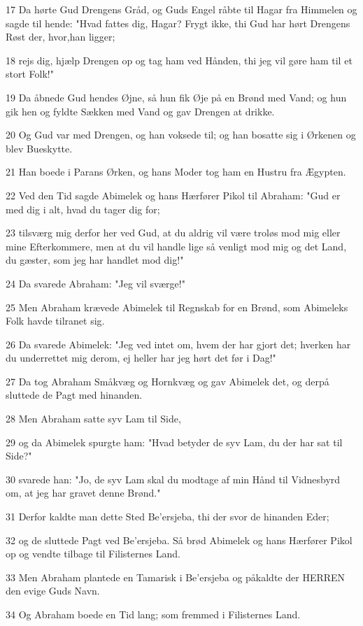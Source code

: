 \par 17 Da hørte Gud Drengens Gråd, og Guds Engel råbte til Hagar fra Himmelen og sagde til hende: "Hvad fattes dig, Hagar? Frygt ikke, thi Gud har hørt Drengens Røst der, hvor,han ligger;
\par 18 rejs dig, hjælp Drengen op og tag ham ved Hånden, thi jeg vil gøre ham til et stort Folk!"
\par 19 Da åbnede Gud hendes Øjne, så hun fik Øje på en Brønd med Vand; og hun gik hen og fyldte Sækken med Vand og gav Drengen at drikke.
\par 20 Og Gud var med Drengen, og han voksede til; og han bosatte sig i Ørkenen og blev Bueskytte.
\par 21 Han boede i Parans Ørken, og hans Moder tog ham en Hustru fra Ægypten.
\par 22 Ved den Tid sagde Abimelek og hans Hærfører Pikol til Abraham: "Gud er med dig i alt, hvad du tager dig for;
\par 23 tilsværg mig derfor her ved Gud, at du aldrig vil være troløs mod mig eller mine Efterkommere, men at du vil handle lige så venligt mod mig og det Land, du gæster, som jeg har handlet mod dig!"
\par 24 Da svarede Abraham: "Jeg vil sværge!"
\par 25 Men Abraham krævede Abimelek til Regnskab for en Brønd, som Abimeleks Folk havde tilranet sig.
\par 26 Da svarede Abimelek: "Jeg ved intet om, hvem der har gjort det; hverken har du underrettet mig derom, ej heller har jeg hørt det før i Dag!"
\par 27 Da tog Abraham Småkvæg og Hornkvæg og gav Abimelek det, og derpå sluttede de Pagt med hinanden.
\par 28 Men Abraham satte syv Lam til Side,
\par 29 og da Abimelek spurgte ham: "Hvad betyder de syv Lam, du der har sat til Side?"
\par 30 svarede han: "Jo, de syv Lam skal du modtage af min Hånd til Vidnesbyrd om, at jeg har gravet denne Brønd."
\par 31 Derfor kaldte man dette Sted Be'ersjeba, thi der svor de hinanden Eder;
\par 32 og de sluttede Pagt ved Be'ersjeba. Så brød Abimelek og hans Hærfører Pikol op og vendte tilbage til Filisternes Land.
\par 33 Men Abraham plantede en Tamarisk i Be'ersjeba og påkaldte der HERREN den evige Guds Navn.
\par 34 Og Abraham boede en Tid lang; som fremmed i Filisternes Land.

